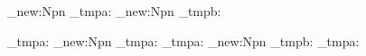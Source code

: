 \ExplSyntaxOn
\cs_new:Npn \zutil_tmpa: { }
\cs_new:Npn \zutil_tmpb: { }

\zutil_tmpa:
\cs_new:Npn \any_tmpa: { }
\zutil_tmpa:
\cs_new:Npn \any_tmpb: { \any_tmpa: }
\ExplSyntaxOff
